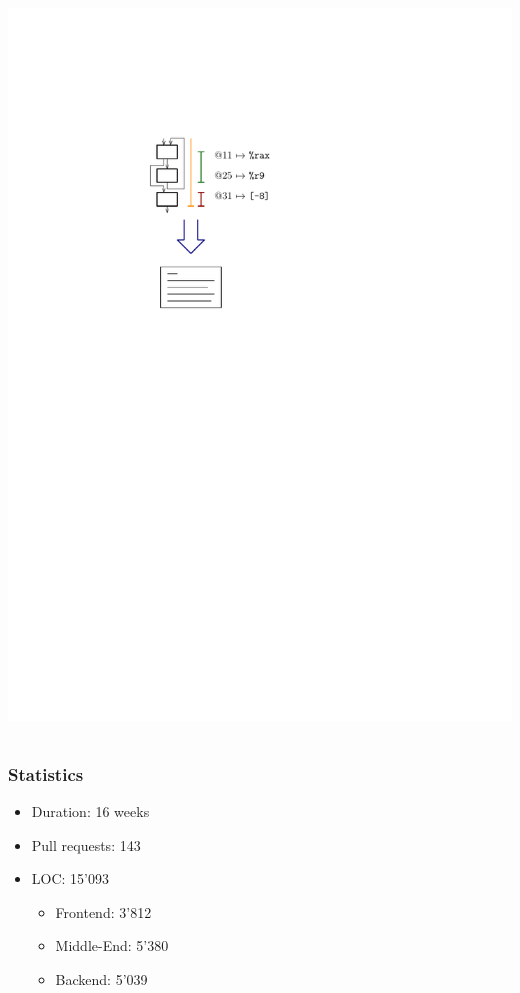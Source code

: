 \documentclass[navbaroff,en]{sdqbeamer}
\begin{document}
\begin{frame}
\begin{columns}
	\begin{column}{0.3\textwidth}
		\centering \includegraphics[scale=0.7]{images/code_generation.pdf}
	\end{column}
\end{columns}
\end{frame}

\begin{frame}
	\frametitle{Statistics}

	\begin{itemize}
		\item Duration: 16 weeks
		\item Pull requests: 143
		\item LOC: 15'093
		\begin{itemize}
			\item Frontend: 3'812
			\item Middle-End: 5'380
			\item Backend: 5'039
		\end{itemize}
	\end{itemize}


\end{frame}



\end{document}
